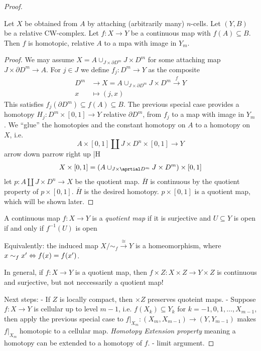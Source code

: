 \documentclass{TemplateLecture}
\begin{document}
\begin{proof}
    \begin{thm}{}{}
        Let \(X\) be obtained from \(A\) by attaching (arbitrarily many) \(n\)-cells. Let \((Y,B)\) be a relative CW-complex. Let \(f\colon X \to Y\) be a continuous map with \(f(A) \subseteq B\). Then \(f\) is homotopic, relative \(A\) to a mpa with image in \(Y_m\).
    \end{thm}
    \begin{proof}
        We may assume \(X = A \cup_{J\times \partial D^m} J\times D^m\) for some attaching map \(J\times \partial D^m \to A\). For \(j \in J\) we define \(f_j\colon D^m \to Y\) as the composite
        \[\begin{split}
            D^m &\to X = A\cup_{J\times \partial D^m} J\times D^m \xrightarrow{f} Y \\
            x &\mapsto (j,x)
        \end{split}\]
        This satisfies \(f_j(\partial D^m) \subseteq f(A) \subseteq B\).
        The previous special case provides a homotopy \(H_j\colon D^m \times [0,1] \to Y\) relative \(\partial D^m\), from \(f_j\) to a map with image in \(Y_m\).
        We \enquote{glue} the homotopies and the constant homotopy on \(A\) to a homotopy on \(X\), i.e.
        \[A\times [0,1] \amalg J\times D^n \times [0,1] \to Y\] %
        arrow down p\times [0,1] arrow right up \bar{H}
        \[X\times [0,1] = (A\cup_{J\times \aprtial D^m} J\times D^m) \times [0,1]\]
        let \(p\colon A\amalg J\times D^n \to X\) be the quotient map.
        \(\bar H\) is continuous by the quotient property of \(p\times [0,1]\). \(\bar{H}\) is the desired homotopy. \(p\times [0,1]\) is a quotient map, which will be shown later.
    \end{proof}
    \begin{defi}
        A continuous map \(f\colon X\to Y\) is a \emph{quotient map} if it is surjective and \(U\subseteq Y\) is open if and only if \(f^{-1}(U)\) is open
    \end{defi}
    Equivalently: the induced map \(X/\sim_{f} \xrightarrow{\cong} Y\) is a homeomorphism, where \(x \sim_f x' \Leftrightarrow f(x) = f(x')\).

    In general, if \(f\colon X\to Y\) is a quotient map, then \(f\times Z\colon X\times Z \to Y\times Z\) is continuous and surjective, but not neccessarily a quotient map!

    Next steps:  - If \(Z\) is locally compact, then \(\times Z\) preserves quoteint maps.
    - Suppose \(f\colon X\to Y\) is cellular up to level \(m-1\), i.e. \(f(X_k) \subseteq Y_k\) for \(k = -1, 0, 1, \dots, X_{m-1}\), then apply the previous special case to \(f\rvert_{X_m} \colon (X_m, X_{m-1}) \to (Y, Y_{m-1})\) makes \(f\rvert_{X_m}\) homotopic to a cellular map. \emph{Homotopy Extension property} meaning a homotopy can be extended to a homotopy of \(f\).
    - limit argument.


\end{proof}
\end{document}
